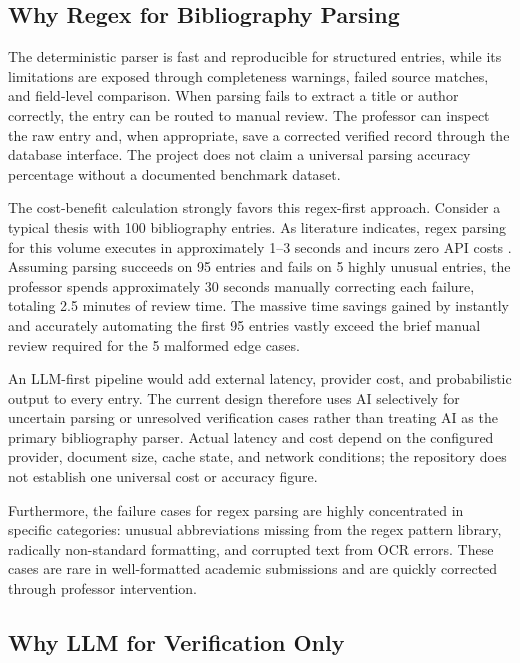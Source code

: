 \documentclass[12pt,a4paper,oneside]{report}
\begin{document}
\subsection{Why Regex for Bibliography Parsing}

The deterministic parser is fast and reproducible for structured entries, while its limitations are exposed through completeness warnings, failed source matches, and field-level comparison. When parsing fails to extract a title or author correctly, the entry can be routed to manual review. The professor can inspect the raw entry and, when appropriate, save a corrected verified record through the database interface. The project does not claim a universal parsing accuracy percentage without a documented benchmark dataset.

The cost-benefit calculation strongly favors this regex-first approach. Consider a typical thesis with 100 bibliography entries. As literature indicates, regex parsing for this volume executes in approximately 1--3 seconds and incurs zero API costs \cite{chen2025}. Assuming parsing succeeds on 95 entries and fails on 5 highly unusual entries, the professor spends approximately 30 seconds manually correcting each failure, totaling 2.5 minutes of review time. The massive time savings gained by instantly and accurately automating the first 95 entries vastly exceed the brief manual review required for the 5 malformed edge cases.

An LLM-first pipeline would add external latency, provider cost, and probabilistic output to every entry. The current design therefore uses AI selectively for uncertain parsing or unresolved verification cases rather than treating AI as the primary bibliography parser. Actual latency and cost depend on the configured provider, document size, cache state, and network conditions; the repository does not establish one universal cost or accuracy figure.

Furthermore, the failure cases for regex parsing are highly concentrated in specific categories: unusual abbreviations missing from the regex pattern library, radically non-standard formatting, and corrupted text from OCR errors. These cases are rare in well-formatted academic submissions and are quickly corrected through professor intervention.

\subsection{Why LLM for Verification Only}
\end{document}
